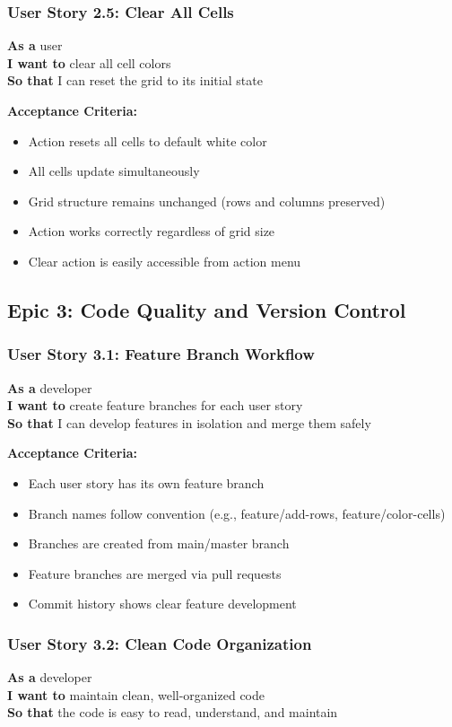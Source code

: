 \documentclass[11pt,a4paper]{article}
\begin{document}
\subsubsection{User Story 2.5: Clear All Cells}
\textbf{As a} user\\
\textbf{I want to} clear all cell colors\\
\textbf{So that} I can reset the grid to its initial state

\textbf{Acceptance Criteria:}
\begin{itemize}[leftmargin=*]
    \item Action resets all cells to default white color
    \item All cells update simultaneously
    \item Grid structure remains unchanged (rows and columns preserved)
    \item Action works correctly regardless of grid size
    \item Clear action is easily accessible from action menu
\end{itemize}

\subsection{Epic 3: Code Quality and Version Control}

\subsubsection{User Story 3.1: Feature Branch Workflow}
\textbf{As a} developer\\
\textbf{I want to} create feature branches for each user story\\
\textbf{So that} I can develop features in isolation and merge them safely

\textbf{Acceptance Criteria:}
\begin{itemize}[leftmargin=*]
    \item Each user story has its own feature branch
    \item Branch names follow convention (e.g., feature/add-rows, feature/color-cells)
    \item Branches are created from main/master branch
    \item Feature branches are merged via pull requests
    \item Commit history shows clear feature development
\end{itemize}

\subsubsection{User Story 3.2: Clean Code Organization}
\textbf{As a} developer\\
\textbf{I want to} maintain clean, well-organized code\\
\textbf{So that} the code is easy to read, understand, and maintain
\end{document}
